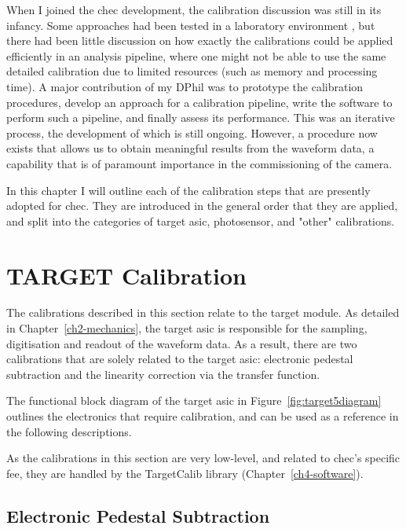 When I joined the \gls{chec} development, the calibration discussion was still in its infancy. Some approaches had been tested in a laboratory environment \cite{Bechtol2012}, but there had been little discussion on how exactly the calibrations could be applied efficiently in an analysis pipeline, where one might not be able to use the same detailed calibration due to limited resources (such as memory and processing time). A major contribution of my DPhil was to prototype the calibration procedures, develop an approach for a calibration pipeline, write the software to perform such a pipeline, and finally assess its performance. This was an iterative process, the development of which is still ongoing. However, a procedure now exists that allows us to obtain meaningful results from the waveform data, a capability that is of paramount importance in the commissioning of the camera.

In this chapter I will outline each of the calibration steps that are presently adopted for \gls{chec}. They are introduced in the general order that they are applied, and split into the categories of \gls{target} \gls{asic}, photosensor, and "other" calibrations.

\section{TARGET Calibration}

The calibrations described in this section relate to the \gls{target} module. As detailed in Chapter~\ref{ch2-mechanics}, the \gls{target} \gls{asic} is responsible for the sampling, digitisation and readout of the waveform data. As a result, there are two calibrations that are solely related to the \gls{target} \gls{asic}: electronic pedestal subtraction and the linearity correction via the transfer function. 

The functional block diagram of the \gls{target} \gls{asic} in Figure~\ref{fig:target5diagram} outlines the electronics that require calibration, and can be used as a reference in the following descriptions.

As the calibrations in this section are very low-level, and related to \gls{chec}'s specific \gls{fee}, they are handled by the TargetCalib library (Chapter~\ref{ch4-software}).

\subsection{Electronic Pedestal Subtraction}

